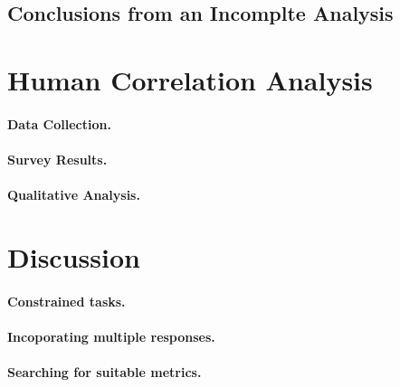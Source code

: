\documentclass[runningheads]{llncs}
\begin{document}
\subsection{Conclusions from an Incomplte Analysis}

\section{Human Correlation Analysis}
\paragraph{Data Collection.}
\paragraph{Survey Results.}
\paragraph{Qualitative Analysis.}

\section{Discussion}
\paragraph{Constrained tasks.}
\paragraph{Incoporating multiple responses.}
\paragraph{Searching for suitable metrics.}
\end{document}
